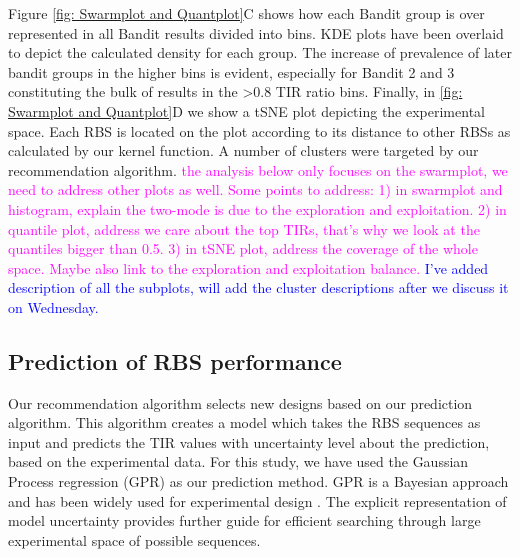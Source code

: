 \documentclass{article}
\newcommand{\mengyan}[1]{\textcolor{magenta}{#1}}
\newcommand{\maciej}[1]{\textcolor{blue}{#1}}
\begin{document}
Figure \ref{fig: Swarmplot and Quantplot}C shows how each Bandit group is over represented in all Bandit results divided into bins. 
KDE plots have been overlaid to depict the calculated density for each group.
The increase of prevalence of later bandit groups in the higher bins is evident, especially for Bandit 2 and 3 constituting the bulk of results in the >0.8 TIR ratio bins.
Finally, in \ref{fig: Swarmplot and Quantplot}D we show a tSNE plot depicting the experimental space.
Each RBS is located on the plot according to its distance to other RBSs as calculated by our kernel function.
A number of clusters were targeted by our recommendation algorithm.
\mengyan{the analysis below only focuses on the swarmplot, we need to address other plots as well. Some points to address: 
1) in swarmplot and histogram, explain the two-mode is due to the exploration and exploitation. 
2) in quantile plot, address we care about the top TIRs, that's why we look at the quantiles bigger than 0.5.
3) in tSNE plot, address the coverage of the whole space. Maybe also link to the exploration and exploitation balance.}
\maciej{I've added description of all the subplots, will add the cluster descriptions after we discuss it on Wednesday.}

\subsection{Prediction of RBS performance}

Our recommendation algorithm selects new designs based on our prediction algorithm.
This algorithm creates a model which takes the RBS sequences as input and predicts the TIR values with uncertainty level about the prediction, based on the experimental data.
For this study, we have used the Gaussian Process regression (GPR) as our prediction method.
GPR is a Bayesian approach and has been widely used for experimental design \cite{srinivas2012information, romero_navigating_2013}.
The explicit representation of model uncertainty provides further guide for efficient searching through large experimental space of possible sequences.
\end{document}
